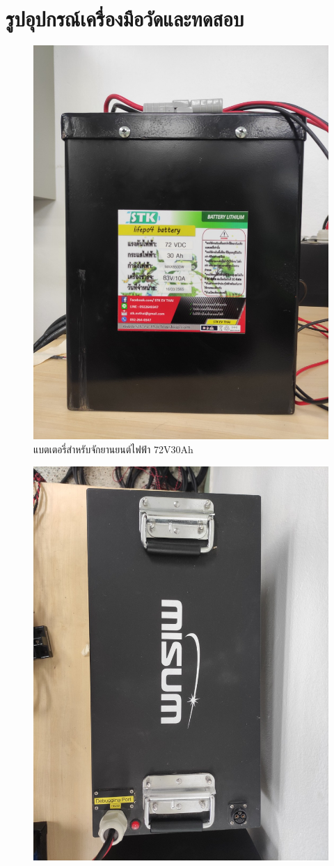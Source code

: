 \appendix[nosub] %

\chapter{รูปอุปกรณ์เครื่องมือวัดและทดสอบ}
\begin{center}
 \begin{figure}[H]
		\includegraphics[width=0.5\linewidth]{Chapters/img/Battery_72V30Ah.jpg}
		\centering
		\captionsetup{justification=centering,margin=2cm}
		\caption{แบตเตอรี่สำหรับจักยานยนต์ไฟฟ้า 72V30Ah}
	\end{figure}
	\begin{figure}[H]
		\includegraphics[width=0.5\linewidth]{Chapters/img/Battery_72V60Ah.jpg}
		\centering
		\captionsetup{justification=centering,margin=2cm}

\end{figure}
\end{center}
